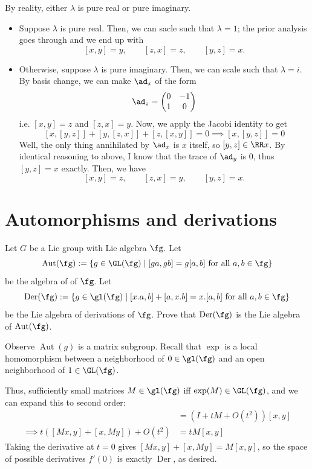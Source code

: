 \documentclass[11pt, headheight=30pt]{scrartcl}
\DeclareMathOperator{\Aut}{Aut}
\DeclareMathOperator{\Der}{Der}
\begin{document}
By reality, either $\lambda$ is pure real or pure imaginary.
\begin{itemize}
    \item Suppose $\lambda$ is pure real. Then, we can sacle such that $\lambda = 1$;
    the prior analysis goes through and we end up with
    \[
        [x,y] = y, \qquad [z,x] = z,\qquad [y,z] = x.    
    \]
    \item Otherwise, suppose $\lambda$ is pure imaginary. Then, we can scale
    such that $\lambda = i$. By basis change, we can make $\ad_x$
    of the form
    \[
        \ad_z = \begin{pmatrix}
            0 & -1\\
            1 & 0
        \end{pmatrix}
    \]
    i.e. $[x,y] = z$ and $[z,x] = y$.
    Now, we apply the Jacobi identity to get
    \[
        [x, [y,z]] + [y, [z,x]] + [z, [x,y]] = 0\implies [x, [y,z]] = 0
    \]
    Well, the only thing annihilated by $\ad_x$ is $x$ itself,
    so $[y,z] \in \RR x$. By identical reasoning to above,
    I know that the trace of $\ad_y$ is $0$, thus $[y,z] = x$
    exactly. Then, we have
    \[
        [x,y] = z, \qquad [z,x] = y,\qquad [y,z] = x.
    \]
\end{itemize}

\section{Automorphisms and derivations}

\begin{prob}
    Let $G$ be a Lie group with Lie algebra $\fg$. Let
    \[
        \Aut(\fg) := \{g \in \GL(\fg) \mid [ga, gb] = g[a, b] \text{ for all } a, b \in \fg\}
    \]
    be the algebra of  of $\fg$. Let
    \[
        \Der(\fg) := \{g \in \gl(\fg) \mid [x.a, b] + [a, x.b] = x.[a, b] \text{ for all } a, b \in \fg\}
    \]
    be the Lie algebra of derivations of $\fg$.
    Prove that $\Der(\fg)$ is the Lie algebra of $\Aut(\fg)$.
\end{prob}

Observe $\Aut(g)$ is a matrix subgroup. Recall that $\exp$ is a local
homomorphism between a neighborhood of $0\in \gl(\fg)$ and
an open neighborhood of $1 \in \GL(\fg)$.

Thus, sufficiently small matrices $M\in \gl(\fg)$ iff $\exp(M) \in \GL(\fg)$,
and we can expand this to second order:
\begin{align*}
    [(I+tM+O(t^2))x , (I+tM+O(t^2))y] &= (I+tM+O(t^2))[x,y]\\
    \implies t\left([Mx,y]+[x,My]\right) + O(t^2) &= t M[x,y]
\end{align*}
Taking the derivative at $t=0$ gives $[Mx,y] + [x,My] = M[x,y]$,
so the space of possible derivatives $f'(0)$ is exactly $\Der$, as desired.
\end{document}
